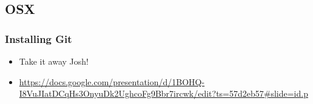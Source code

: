 \documentclass{beamer}
\begin{document}
\subsection{OSX}
\begin{frame}
    \frametitle{Installing Git}
    \begin{itemize}

        \item{Take it away Josh!}
        \item{\url{https://docs.google.com/presentation/d/1BOHQ-I8VuJIatDCqHs3OnyuDk2UghcoFg9Bbr7ircwk/edit?ts=57d2eb57\#slide=id.p}}


    \end{itemize}

\end{frame} 
\end{document}
